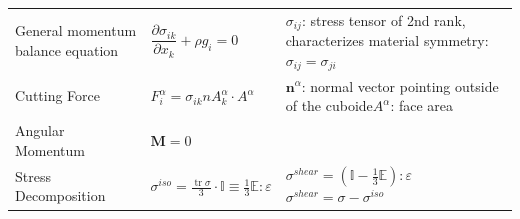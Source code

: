 \begin{tabularx}{ \columnwidth} {p{4cm}lX}
	\hline 
	General momentum balance equation &  $\dfrac{\partial \sigma_{ik}}{\partial x_k} + \rho g_i = 0$ & $\sigma_{ij}$: stress tensor of 2nd rank, characterizes material symmetry: $\sigma_{ij} = \sigma_{ji}$\\
	Cutting Force & $F_i^\alpha = \sigma_{ik} nA^\alpha_k \cdot A^\alpha$ & $\mathbf{n}^\alpha$: normal vector pointing outside of the cuboide\newline $A^\alpha$: face area 
	\\
	
	Angular Momentum &
	$\mathbf{M} = 0 $ &
	\\
	Stress Decomposition &  $\sigma^{iso}=\frac{\operatorname{tr} \sigma}{3} \cdot \mathbb{I} \equiv \frac{1}{3} \mathbb{E} : \varepsilon$ 
	&$\sigma^{shear}= \left(\mathbb{I}- \frac{1}{3}\mathbb{E} \right) : \varepsilon\qquad $ 
	$\sigma^{shear} = \sigma -\sigma^{iso}$\\ 
	

\end{tabularx}
